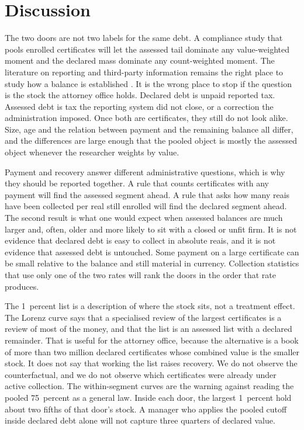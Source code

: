 \section{Discussion}\label{sec:discussion}

The two doors are not two labels for the same debt.
A compliance study that pools enrolled \vat{} certificates will let the assessed tail dominate any value-weighted moment and the declared mass dominate any count-weighted moment.
The literature on reporting and third-party information remains the right place to study how a balance is established \citep{kleven2011,pomeranz2015,naritomi2019}.
It is the wrong place to stop if the question is the stock the attorney office holds.
Declared debt is unpaid reported tax.
Assessed debt is tax the reporting system did not close, or a correction the administration imposed.
Once both are certificates, they still do not look alike.
Size, age and the relation between payment and the remaining balance all differ, and the differences are large enough that the pooled object is mostly the assessed object whenever the researcher weights by value.

Payment and recovery answer different administrative questions, which is why they should be reported together.
A rule that counts certificates with any payment will find the assessed segment ahead.
A rule that asks how many reais have been collected per real still enrolled will find the declared segment ahead.
The second result is what one would expect when assessed balances are much larger and, often, older and more likely to sit with a closed or unfit firm.
It is not evidence that declared debt is easy to collect in absolute reais, and it is not evidence that assessed debt is untouched.
Some payment on a large certificate can be small relative to the balance and still material in currency.
Collection statistics that use only one of the two rates will rank the doors in the order that rate produces.

The 1~percent list is a description of where the stock sits, not a treatment effect.
The Lorenz curve says that a specialised review of the largest certificates is a review of most of the money, and that the list is an assessed list with a declared remainder.
That is useful for the attorney office, because the alternative is a book of more than two million declared certificates whose combined value is the smaller stock.
It does not say that working the list raises recovery.
We do not observe the counterfactual, and we do not observe which certificates were already under active collection.
The within-segment curves are the warning against reading the pooled 75~percent as a general law.
Inside each door, the largest 1~percent hold about two fifths of that door's stock.
A manager who applies the pooled cutoff inside declared debt alone will not capture three quarters of declared value.


